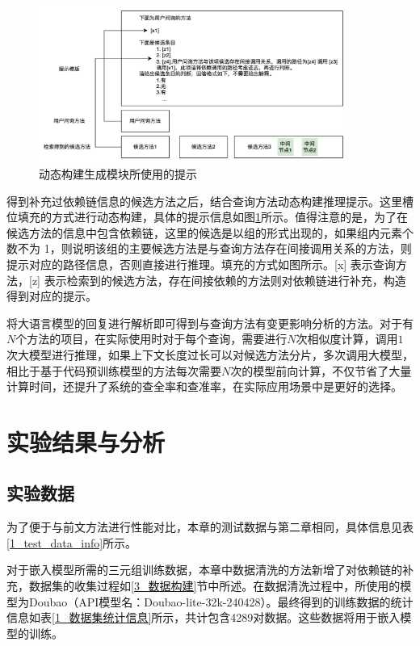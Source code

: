 \begin{figure}[htbp]
\centering
\includegraphics[width = 0.9\textwidth]{figures/提示词填充.jpg}
\caption{动态构建生成模块所使用的提示}
\label{2_推理prompt}
\end{figure}

得到补充过依赖链信息的候选方法之后，结合查询方法动态构建推理提示。这里槽位填充的方式进行动态构建，具体的提示信息如图\ref{2_推理prompt}所示。值得注意的是，为了在候选方法的信息中包含依赖链，这里的候选是以组的形式出现的，如果组内元素个数不为 1，则说明该组的主要候选方法是与查询方法存在间接调用关系的方法，则提示对应的路径信息，否则直接进行推理。填充的方式如图所示。[x] 表示查询方法，[z] 表示检索到的候选方法，存在间接依赖的方法则对依赖链进行补充，构造得到对应的提示。




将大语言模型的回复进行解析即可得到与查询方法有变更影响分析的方法。对于有$N$个方法的项目，在实际使用时对于每个查询，需要进行$N$次相似度计算，调用$1$次大模型进行推理，如果上下文长度过长可以对候选方法分片，多次调用大模型，相比于基于代码预训练模型的方法每次需要$N$次的模型前向计算，不仅节省了大量计算时间，还提升了系统的查全率和查准率，在实际应用场景中是更好的选择。


\section{实验结果与分析}

\subsection{实验数据}

为了便于与前文方法进行性能对比，本章的测试数据与第二章相同，具体信息见表\ref{1_test_data_info}所示。

对于嵌入模型所需的三元组训练数据，本章中数据清洗的方法新增了对依赖链的补充，数据集的收集过程如\ref{3_数据构建}节中所述。在数据清洗过程中，所使用的模型为Doubao（API模型名：Doubao-lite-32k-240428）。最终得到的训练数据的统计信息如表\ref{1_数据集统计信息}所示，共计包含4289对数据。这些数据将用于嵌入模型的训练。


